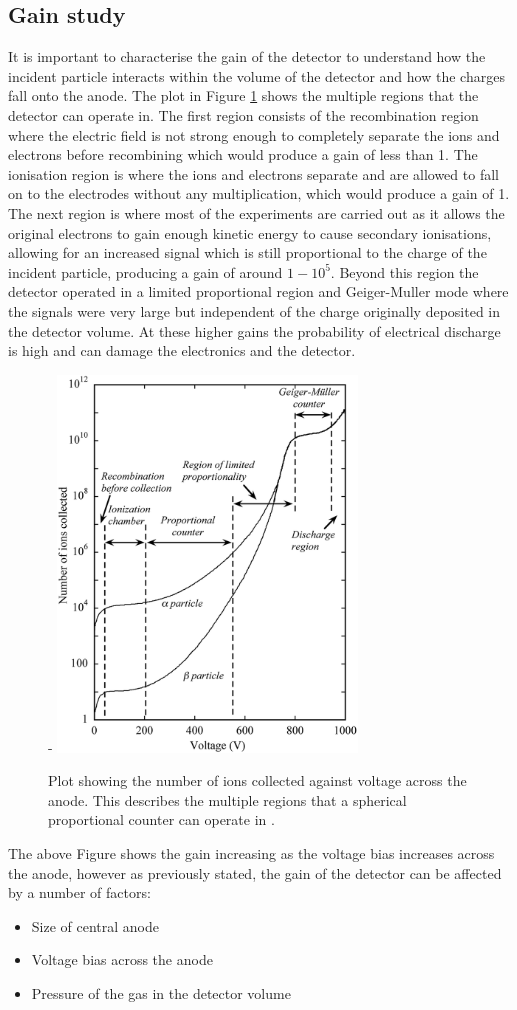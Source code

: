 \documentclass[a4paper]{article}
\begin{document}
\subsection{Gain study} \label{gain}
It is important to characterise the gain of the detector to understand how the incident particle interacts within the volume of the detector and how the charges fall onto the anode. The plot in Figure \ref{fig:gain} shows the multiple regions that the detector can operate in. The first region consists of the recombination region where the electric field is not strong enough to completely separate the ions and electrons before recombining which would produce a gain of less than 1. The ionisation region is where the ions and electrons separate and are allowed to fall on to the electrodes without any multiplication, which would produce a gain of 1. The next region is where most of the experiments are carried out as it allows the original electrons to gain enough kinetic energy to cause secondary ionisations, allowing for an increased signal which is still proportional to the charge of the incident particle, producing a gain of around $1-10^5$. Beyond this region the detector operated in a limited proportional region and Geiger-Muller mode where the signals were very large but independent of the charge originally deposited in the detector volume. At these higher gains the probability of electrical discharge is high and can damage the electronics and the detector.
\begin{figure}[H]-
    \centering
    \includegraphics[height=10cm]{gain.png}
    \caption{Plot showing the number of ions collected against voltage across the anode. This describes the multiple regions that a spherical proportional counter can operate in \cite{sauli_2014}.}
    \label{fig:gain}
\end{figure}
\noindent The above Figure shows the gain increasing as the voltage bias increases across the anode, however as previously stated, the gain of the detector can be affected by a number of factors:
\begin{itemize}
    \item {Size of central anode}
    \item {Voltage bias across the anode}
    \item {Pressure of the gas in the detector volume}
\end{itemize}
\end{document}
